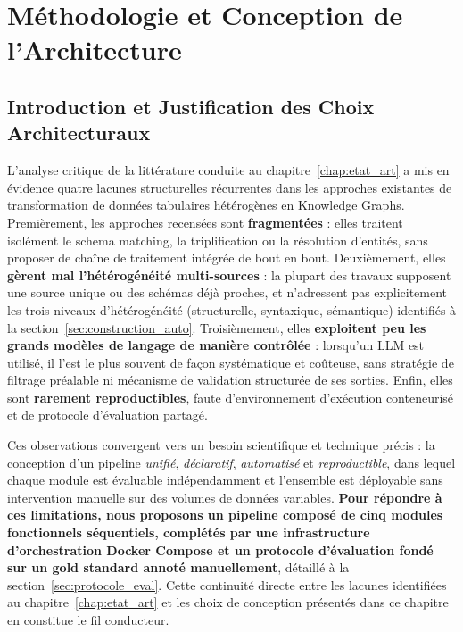 
\chapter{Méthodologie et Conception de l'Architecture}
\label{chap:methodologie}

\section{Introduction et Justification des Choix Architecturaux}
\label{sec:intro_methodo}

L'analyse critique de la littérature conduite au chapitre~\ref{chap:etat_art}
a mis en évidence quatre lacunes structurelles récurrentes dans les approches
existantes de transformation de données tabulaires hétérogènes en Knowledge
Graphs. Premièrement, les approches recensées sont \textbf{fragmentées} :
elles traitent isolément le schema matching, la triplification ou la
résolution d'entités, sans proposer de chaîne de traitement intégrée de
bout en bout. Deuxièmement, elles \textbf{gèrent mal l'hétérogénéité
multi-sources} : la plupart des travaux supposent une source unique ou
des schémas déjà proches, et n'adressent pas explicitement les trois
niveaux d'hétérogénéité (structurelle, syntaxique, sémantique) identifiés
à la section~\ref{sec:construction_auto}. Troisièmement, elles
\textbf{exploitent peu les grands modèles de langage de manière
contrôlée} : lorsqu'un LLM est utilisé, il l'est le plus souvent de
façon systématique et coûteuse, sans stratégie de filtrage préalable ni
mécanisme de validation structurée de ses sorties. Enfin, elles sont
\textbf{rarement reproductibles}, faute d'environnement d'exécution
conteneurisé et de protocole d'évaluation partagé.

Ces observations convergent vers un besoin scientifique et technique précis :
la conception d'un pipeline \textit{unifié}, \textit{déclaratif},
\textit{automatisé} et \textit{reproductible}, dans lequel chaque module est
évaluable indépendamment et l'ensemble est déployable sans intervention
manuelle sur des volumes de données variables.
\textbf{Pour répondre à ces limitations, nous proposons un pipeline composé
de cinq modules fonctionnels séquentiels, complétés par une infrastructure
d'orchestration Docker Compose et un protocole d'évaluation fondé sur un
gold standard annoté manuellement}, détaillé à la
section~\ref{sec:protocole_eval}. Cette continuité directe entre les
lacunes identifiées au chapitre~\ref{chap:etat_art} et les choix de
conception présentés dans ce chapitre en constitue le fil conducteur.

